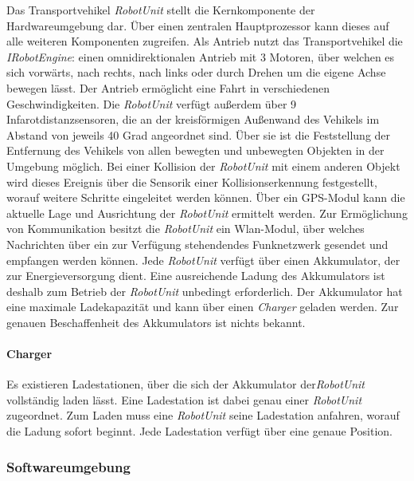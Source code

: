   Das Transportvehikel \emph{RobotUnit} stellt die Kernkomponente der Hardwareumgebung dar. 
  Über einen zentralen Hauptprozessor kann dieses auf alle weiteren Komponenten zugreifen. 
  Als Antrieb nutzt das Transportvehikel die \emph{IRobotEngine}: einen omnidirektionalen Antrieb mit 3 Motoren, über welchen es sich vorwärts, nach rechts, nach links oder durch Drehen um die eigene Achse bewegen lässt. 
  Der Antrieb ermöglicht eine Fahrt in verschiedenen Geschwindigkeiten. 
  Die \emph{RobotUnit} verfügt außerdem über 9 Infarotdistanzsensoren, die an der kreisförmigen Außenwand des Vehikels im Abstand von jeweils 40 Grad angeordnet sind. 
  Über sie ist die Feststellung der Entfernung des Vehikels von allen bewegten und unbewegten Objekten in der Umgebung möglich. 
  Bei einer Kollision der \emph{RobotUnit} mit einem anderen Objekt wird dieses Ereignis über die Sensorik einer Kollisionserkennung festgestellt, worauf weitere Schritte eingeleitet werden können. 
  Über ein GPS-Modul kann die aktuelle Lage und Ausrichtung der \emph{RobotUnit} ermittelt werden. 
  Zur Ermöglichung von Kommunikation besitzt die \emph{RobotUnit} ein Wlan-Modul, über welches Nachrichten über ein zur Verfügung stehendendes Funknetzwerk gesendet und empfangen werden können. 
  Jede \emph{RobotUnit} verfügt über einen Akkumulator, der zur Energieversorgung dient. 
  Eine ausreichende Ladung des Akkumulators ist deshalb zum Betrieb der \emph{RobotUnit} unbedingt erforderlich. 
  Der Akkumulator hat eine maximale Ladekapazität und kann über einen \emph{Charger} geladen werden. 
  Zur genauen Beschaffenheit des Akkumulators ist nichts bekannt.

  \paragraph{Charger}\label{charger}

  Es existieren Ladestationen, über die sich der Akkumulator der\emph{RobotUnit} vollständig laden lässt. 
  Eine Ladestation ist dabei genau einer \emph{RobotUnit} zugeordnet. 
  Zum Laden muss eine \emph{RobotUnit} seine Ladestation anfahren, worauf die Ladung sofort beginnt. 
  Jede Ladestation verfügt über eine genaue Position.

    \subsubsection{Softwareumgebung}

